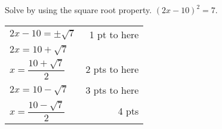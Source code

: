 {
	Solve by using the square root property. $\displaystyle (2x-10)^2=7$.
}
{
	\begin{tabular}{l r}
	$2x-10=\pm\sqrt{7}$ & 1 pt to here\\
	$2x=10+\sqrt{7}$ &  \\
	$x=\dfrac{10+\sqrt{7}}{2}$ & 2 pts to here \\
	$2x=10-\sqrt{7}$ & 3 pts to here\\
	$x=\dfrac{10-\sqrt{7}}{2}$ & 4 pts \\
	\end{tabular}
}
